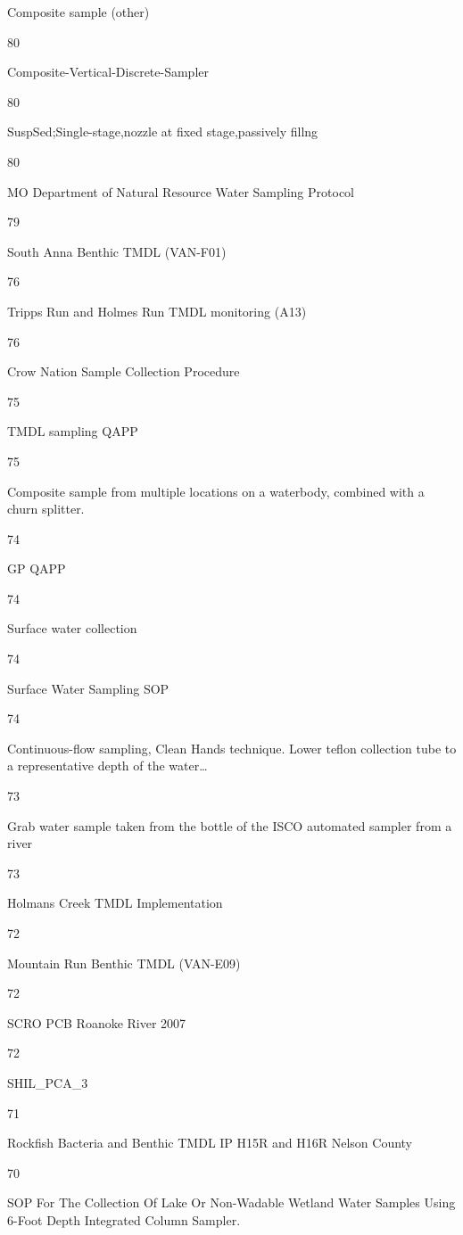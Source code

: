 \documentclass[]{article}
\begin{document}
Composite sample (other)

80

Composite-Vertical-Discrete-Sampler

80

SuspSed;Single-stage,nozzle at fixed stage,passively fillng

80

MO Department of Natural Resource Water Sampling Protocol

79

South Anna Benthic TMDL (VAN-F01)

76

Tripps Run and Holmes Run TMDL monitoring (A13)

76

Crow Nation Sample Collection Procedure

75

TMDL sampling QAPP

75

Composite sample from multiple locations on a waterbody, combined with a
churn splitter.

74

GP QAPP

74

Surface water collection

74

Surface Water Sampling SOP

74

Continuous-flow sampling, Clean Hands technique. Lower teflon collection
tube to a representative depth of the water\ldots{}

73

Grab water sample taken from the bottle of the ISCO automated sampler
from a river

73

Holmans Creek TMDL Implementation

72

Mountain Run Benthic TMDL (VAN-E09)

72

SCRO PCB Roanoke River 2007

72

SHIL\_PCA\_3

71

Rockfish Bacteria and Benthic TMDL IP H15R and H16R Nelson County

70

SOP For The Collection Of Lake Or Non-Wadable Wetland Water Samples
Using 6-Foot Depth Integrated Column Sampler.
\end{document}
